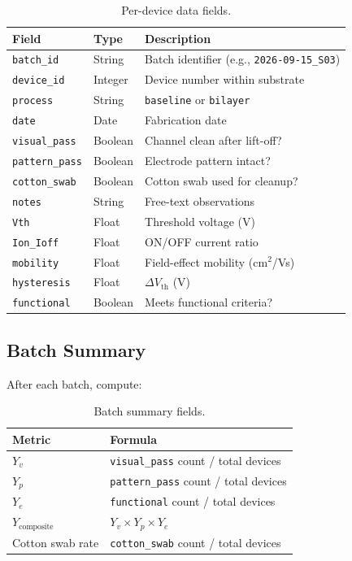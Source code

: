 \documentclass[11pt,a4paper]{article}
\begin{document}
\begin{table}[H]
\centering
\caption{Per-device data fields.}
\begin{tabular}{@{}llp{6cm}@{}}
\toprule
\textbf{Field} & \textbf{Type} & \textbf{Description} \\
\midrule
\texttt{batch\_id} & String & Batch identifier (e.g., \texttt{2026-09-15\_S03}) \\
\texttt{device\_id} & Integer & Device number within substrate \\
\texttt{process} & String & \texttt{baseline} or \texttt{bilayer} \\
\texttt{date} & Date & Fabrication date \\
\texttt{visual\_pass} & Boolean & Channel clean after lift-off? \\
\texttt{pattern\_pass} & Boolean & Electrode pattern intact? \\
\texttt{cotton\_swab} & Boolean & Cotton swab used for cleanup? \\
\texttt{notes} & String & Free-text observations \\
\texttt{Vth} & Float & Threshold voltage (V) \\
\texttt{Ion\_Ioff} & Float & ON/OFF current ratio \\
\texttt{mobility} & Float & Field-effect mobility (cm$^2$/Vs) \\
\texttt{hysteresis} & Float & $\Delta V_{\text{th}}$ (V) \\
\texttt{functional} & Boolean & Meets functional criteria? \\
\bottomrule
\end{tabular}
\end{table}

\subsection{Batch Summary}

After each batch, compute:

\begin{table}[H]
\centering
\caption{Batch summary fields.}
\begin{tabular}{@{}ll@{}}
\toprule
\textbf{Metric} & \textbf{Formula} \\
\midrule
$Y_v$ & \texttt{visual\_pass} count / total devices \\
$Y_p$ & \texttt{pattern\_pass} count / total devices \\
$Y_e$ & \texttt{functional} count / total devices \\
$Y_{\text{composite}}$ & $Y_v \times Y_p \times Y_e$ \\
Cotton swab rate & \texttt{cotton\_swab} count / total devices \\
\bottomrule
\end{tabular}
\end{table}
\end{document}
